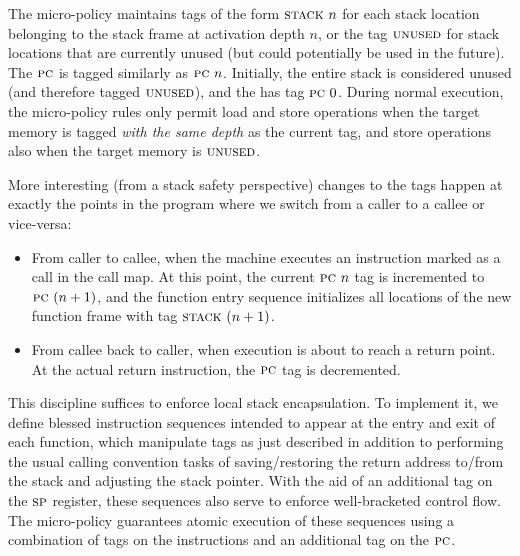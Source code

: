 \documentclass[acmsmall,review,anonymous]{acmart}\settopmatter{printfolios=true,printccs=false,printacmref=false}
\newcommand*{\rsp}{\textsc{sp}}
\begin{document}
{The micro-policy maintains tags of the form $\textsc{stack} ~ n$ for
each stack location belonging to the stack frame at activation depth
$n$, or the tag $\textsc{unused}$ for stack locations that are currently
unused (but could potentially be used in the future).
%
The $\textsc{pc}$ is tagged similarly as $\textsc{pc} ~ n$.
%
Initially, the entire stack is considered unused (and therefore tagged
$\textsc{unused}$), and the {\PCname} has tag $\textsc{pc} ~ 0$.
%
During normal execution, the micro-policy rules only permit load and
store operations when the target memory is tagged {\em with the same
  depth} as the current {\PCname} tag, and store operations also when the
target memory is $\textsc{unused}$.


More interesting (from a stack safety perspective) changes to the tags
happen at exactly the points in the program where we switch from a
caller to a callee or vice-versa:

\begin{itemize}

\item From caller to callee, when the machine executes an instruction marked as a call in
  the call map.
  At this point, the current
  $\textsc{pc} ~ n$ tag is incremented to $\textsc{pc} ~ (n + 1)$, and the function
  entry sequence initializes  all locations of the new function frame with
  tag $\textsc{stack} ~ (n + 1)$.

\item From callee back to caller, when execution is about to reach a
  return point.
  At the actual return instruction,
  the $\textsc{pc}$ tag is decremented.

\end{itemize}

This discipline suffices to enforce local stack encapsulation.
To implement it,  we define blessed instruction sequences
intended to appear at the entry and exit of each function,
which manipulate tags as just described in addition to performing the
usual calling convention tasks of saving/restoring the return address to/from
the stack and adjusting the stack pointer. With the aid of an additional tag on
the $\rsp$ register, these sequences also serve to enforce
well-bracketed control flow.
The micro-policy guarantees atomic execution of these sequences
using a combination of tags on the instructions
and an additional tag on the $\textsc{pc}$.

}
\end{document}

